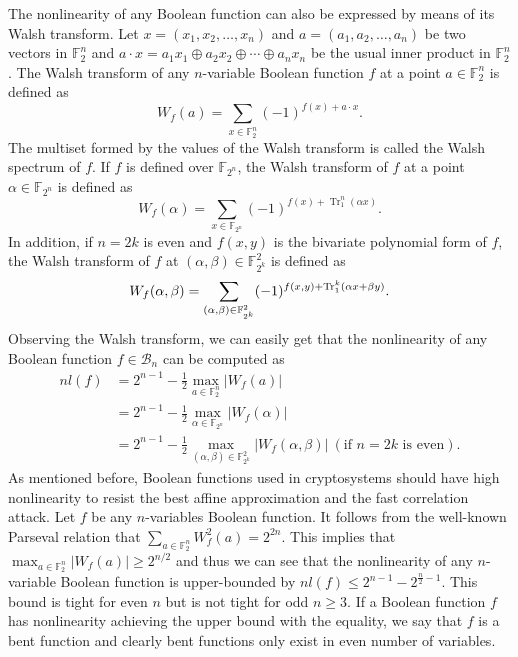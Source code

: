 \documentclass{article}
\newcommand{\F}{\mathbb{F}}
\newcommand{\0}{\textbf{0}}
\newcommand{\1}{\textbf{1}}
\newcommand{\TrN}{\operatorname{Tr}_1^n}
\theoremstyle{plain}
\begin{document}
    The nonlinearity of any Boolean function can also be expressed by means of its Walsh transform.
    Let $x=(x_1,x_2,\dots,x_n)$ and $a=(a_1,a_2,\dots,a_n)$ be two vectors in $\F_2^n$ and $a\cdot x=a_1x_1\oplus a_2x_2\oplus\cdots\oplus a_nx_n$ be the usual inner product in $\F_2^n$.
    The Walsh transform of any $n$-variable Boolean function $f$ at a point $a\in\F_2^n$ is defined as
    \[W_f(a)=\sum_{x\in\F_2^n}(-1)^{f(x)+a\cdot x}.\]
    The multiset formed by the values of the Walsh transform is called the Walsh spectrum of $f$.
    If $f$ is defined over $\F_{2^n}$, the Walsh transform of $f$ at a point $\alpha\in\F_{2^n}$ is defined as
    \[W_f(\alpha)=\sum_{x\in\F_{2^n}}(-1)^{f(x)+\TrN(\alpha x)}.\]
    In addition, if $n=2k$ is even and $f(x,y)$ is the bivariate polynomial form of $f$, the Walsh transform of $f$ at $(\alpha,\beta)\in\F_{2^k}^2$ is defined as
    \[W_f(\alpha,\beta)=\sum_{(\alpha,\beta)\in\F_{2^k}^2}(-1)^{f(x,y)+\Tr_1^k(\alpha x+\beta y)}.\]
    Observing the Walsh transform, we can easily get that the nonlinearity of any Boolean function $f\in\mathcal{B}_n$ can be computed as
    \begin{align*}
        nl(f) &= 2^{n-1} - \frac{1}{2}\max_{a\in\F_2^n}|W_f(a)|\\
              &= 2^{n-1} - \frac{1}{2}\max_{\alpha\in\F_{2^n}}|W_f(\alpha)|\\
              &= 2^{n-1} - \frac{1}{2}\max_{(\alpha,\beta)\in\F_{2^k}^2}|W_f(\alpha,\beta)|~(\text{if }n=2k\text{ is even}).
    \end{align*}
    As mentioned before, Boolean functions used in cryptosystems should have high nonlinearity to resist the best affine approximation and the fast correlation attack.
   Let $f$ be any $n$-variables Boolean function. It follows from the well-known Parseval relation that $\sum_{a\in\F_2^n}W_f^2(a)=2^{2n}$.
   This implies that $\max_{a\in\F_2^n}\left\lvert W_f(a)\right\rvert \geq  2^{n/2}$ and thus we can see that
   the nonlinearity of any $n$-variable Boolean function is upper-bounded by $nl(f)\le 2^{n-1}-2^{\frac{n}{2}-1}$.
    This bound is tight for even $n$ but is not tight for odd $n\geq 3$.
    If a Boolean function $f$ has nonlinearity achieving the upper bound with the equality,
    we say that $f$ is a bent function and clearly bent functions only exist in even number of variables.
\end{document}

